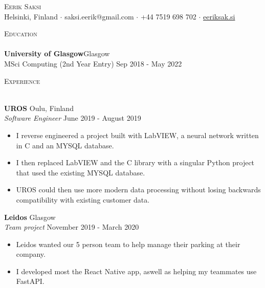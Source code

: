 \documentclass[a4paper]{article}
\newcommand{\lineunder} {
    \vspace*{-8pt} \\
    \hspace*{-18pt} \hrulefill \\
}
\newcommand{\header} [1] {
    {\hspace*{-18pt}\vspace*{6pt} \textsc{#1}}
    \vspace*{-6pt} \lineunder
}
\begin{document}
\vspace*{-40pt}

    

\vspace*{-10pt}
\begin{center}
	{\Huge \scshape {Eerik Saksi}}\\
  Helsinki, Finland $\cdot$ saksi.eerik@gmail.com $\cdot$ +44 7519 698 702 $\cdot$ \href{https://eeriksak.si}{eeriksak.si}  \\
\end{center}

\header{Education}
\textbf{University of Glasgow}\hfill Glasgow\\
    MSci Computing (2nd Year Entry) \hfill Sep 2018 - May 2022\\
\vspace{2mm}

\header{Experience}
\vspace{1mm}

\textbf{UROS} \hfill Oulu, Finland\\
\textit{Software Engineer} \hfill June 2019 - August 2019\\
\vspace{-1mm}
\begin{itemize} \itemsep 1pt
	\item I reverse engineered a project built with LabVIEW, a neural network written in C and an MYSQL database.
  \item I then replaced LabVIEW and the C library with a singular Python project that used the existing MYSQL database.
  \item UROS could then use more modern data processing without losing backwards compatibility with existing customer data.

\end{itemize}
\textbf{Leidos} \hfill Glasgow\\
\textit{Team project} \hfill November 2019 - March 2020\\
\vspace{-1mm}
\begin{itemize} \itemsep 1pt
	\item Leidos wanted our 5 person team to help manage their parking at their company.
  \item I developed most the React Native app, aswell as helping my teammates use FastAPI.
\end{itemize}
\end{document}
